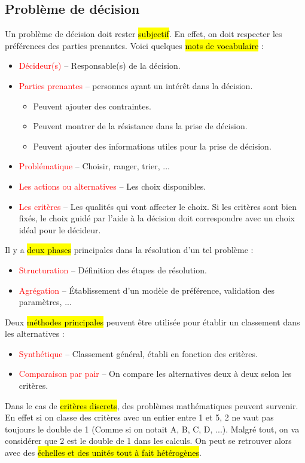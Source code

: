 \documentclass[a4paper, 12pt]{article}
\newcommand{\alinea}{
\hspace*{0.5cm}}
\newcommand{\red}[1]{
	\textcolor{red}{#1}}
\begin{document}
	\subsection{Problème de décision}
		\alinea Un problème de décision doit rester \hl{subjectif}. En effet, on doit respecter les préférences des parties 
			prenantes. Voici quelques \hl{mots de vocabulaire} : 
			\begin{itemize}
				\setlength\itemsep{0cm}
				\item \red{Décideur(s)} -- Responsable(s) de la décision.
				\item \red{Parties prenantes} -- personnes ayant un intérêt dans la décision.
				\begin{itemize}
					\setlength\itemsep{0cm}
					\item Peuvent ajouter des contraintes.
					\item Peuvent montrer de la résistance dans la prise de décision.
					\item Peuvent ajouter des informations utiles pour la prise de décision.
				\end{itemize}
				\item \red{Problématique} -- Choisir, ranger, trier, ...
				\item \red{Les actions ou alternatives} -- Les choix disponibles.
				\item \red{Les critères} -- Les qualités qui vont affecter le choix. Si les critères sont bien fixés, 
					le choix guidé par l'aide à la décision doit correspondre avec un choix idéal pour le décideur.
 			\end{itemize}
		Il y a \hl{deux phases} principales dans la résolution d'un tel problème : 
			\begin{itemize}
				\setlength\itemsep{0cm}
				\item \red{Structuration} -- Définition des étapes de résolution.
				\item \red{Agrégation} -- \'Etablissement d'un modèle de préférence, validation des paramètres, ...
			\end{itemize}
		Deux \hl{méthodes principales} peuvent être utilisée pour établir un classement dans les alternatives : 
			\begin{itemize}
				\setlength\itemsep{0cm}
				\item \red{Synthétique} -- Classement général, établi en fonction des critères.
				\item \red{Comparaison par pair} -- On compare les alternatives deux à deux selon les critères.
			\end{itemize}
		Dans le cas de \hl{critères discrets}, des problèmes mathématiques peuvent survenir. En effet si on classe des
			critères avec un entier entre 1 et 5, 2 ne vaut pas toujours le double de 1 (Comme si on notait A, B, C, D, ...).
			Malgré tout, on va considérer que 2 est le double de 1 dans les calculs.
			On peut se retrouver alors avec des \hl{échelles et des unités tout à fait hétérogènes}.
\end{document}
